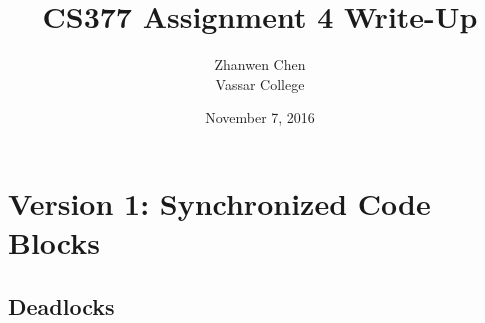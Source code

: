 \documentclass{article}
\begin{document}
\title{CS377 Assignment 4 Write-Up}
\date{November 7, 2016}
\author{Zhanwen Chen\\Vassar College}
\maketitle

\section{Version 1: Synchronized Code Blocks}

\subsection{Deadlocks}
\end{document}
